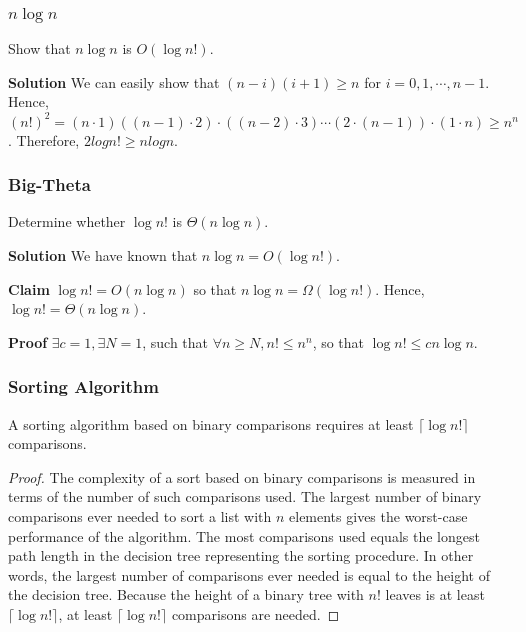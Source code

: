 \documentclass[10pt, compress]{beamer}
\begin{document}
\begin{frame}[fragile]
\frametitle{$n \log n$}
Show that $n \log n$ is $O(\log n!)$.

\textbf{Solution} We
can easily show that $(n - i)(i + 1) \ge n$ for $i = 0, 1, \cdots, n - 1$.
Hence, $(n!)^2 = (n \cdot 1)((n - 1) \cdot 2) \cdot ((n - 2) \cdot 3) \cdots (2 \cdot (n -
1)) \cdot (1 \cdot n) \ge n^n$. Therefore, $2 log n! \ge n log n$.
\end{frame}

\begin{frame}[fragile]
\frametitle{Big-Theta}
Determine whether $\log n!$ is $\Theta(n \log n)$.

\textbf{Solution} We have known that $n \log n = O(\log n!)$.

\textbf{Claim} $\log n! = O(n \log n)$ so that $n \log n = \Omega(\log n!)$. Hence, $\log n! = \Theta(n \log n)$.

\textbf{Proof} $\exists c = 1, \exists N = 1$, such that $\forall n \ge N, n! \le n^n$, so that $\log n! \le c n\log n$.

\end{frame}

\begin{frame}
\frametitle{Sorting Algorithm}
\begin{theorem} \label{t-11-2-1}
	A sorting algorithm based on binary comparisons requires at least $\lceil \log n! \rceil$ comparisons.
\end{theorem}
\begin{proof}
	The complexity of a sort based on binary comparisons is measured in terms of the number	of such comparisons used. The largest number of binary comparisons ever needed to sort a list with $n$ elements gives the worst-case performance of the algorithm. The most comparisons used equals the longest path length in the decision tree representing the sorting procedure. In other words, the largest number of comparisons ever needed is equal to the height of the decision
	tree. Because the height of a binary tree with $n!$ leaves is at least $\lceil \log n! \rceil$, at least $\lceil \log n! \rceil$ comparisons are needed.
\end{proof}
\end{frame}
\end{document}
